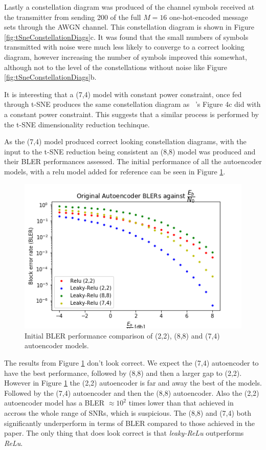 \documentclass[12pt,onecolumn,letterpaper]{article}
\newcommand{\code}{\textit}
\begin{document}
Lastly a constellation diagram was produced of the channel symbols received at the transmitter from sending 200 of the full $M=16$ one-hot-encoded message sets through the AWGN channel. This constellation diagram is shown in Figure \ref{fig:tSneConstellationDiags}c. It was found that the small numbers of symbols transmitted with noise were much less likely to converge to a correct looking diagram, however increasing the number of symbols improved this somewhat, although not to the level of the constellations without noise like Figure \ref{fig:tSneConstellationDiags}b.

It is interesting that a (7,4) model with constant power constraint, once fed through t-SNE produces the same constellation diagram as ~\cite{oShea}'s Figure 4c did with a constant power constraint. This suggests that a similar process is performed by the t-SNE dimensionality reduction techinque. 

As the (7,4) model produced correct looking constellation diagrams, with the input to the t-SNE reduction being consistent an (8,8) model was produced and their BLER performances assessed. The initial performance of all the autoencoder models, with a relu model added for reference can be seen in Figure \ref{fig:AutoencodersAllOriginalComparison}.

\begin{figure}
   \centering
   \includegraphics[width=0.6\linewidth]{figures/autoencoders248_bler_EbNo_original_comparison.png}
   \caption{Initial BLER performance comparison of (2,2), (8,8) and (7,4) autoencoder models. }
   \label{fig:AutoencodersAllOriginalComparison}
\end{figure}

The results from Figure \ref{fig:AutoencodersAllOriginalComparison} don't look correct. We expect the (7,4) autoencoder to have the best performance, followed by (8,8) and then a larger gap to (2,2). However in Figure \ref{fig:AutoencodersAllOriginalComparison} the (2,2) autoencoder is far and away the best of the models. Followed by the (7,4) autoencoder and then the (8,8) autoencoder. Also the (2,2) autoencoder model has a BLER $\approx10^2$ times lower than that achieved in ~\cite{oShea} accross the whole range of SNRs, which is suspicious. The (8,8) and (7,4) both significantly underperform in terms of BLER compared to those achieved in the paper. The only thing that does look correct is that \code{leaky-ReLu} outperforms \code{ReLu}. 
\end{document}
